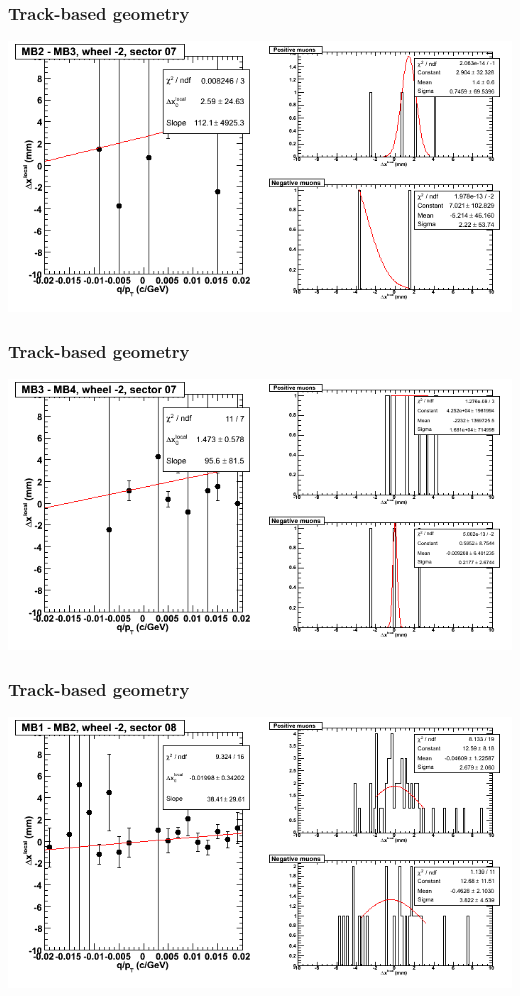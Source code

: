 \documentclass[compress]{beamer}
\begin{document}
\begin{frame}
\frametitle{Track-based geometry}
\includegraphics[width=\linewidth]{NOV4_segdiffs/dt13_resid_A_07_23.png}
\end{frame}

\begin{frame}
\frametitle{Track-based geometry}
\includegraphics[width=\linewidth]{NOV4_segdiffs/dt13_resid_A_07_34.png}
\end{frame}

\begin{frame}
\frametitle{Track-based geometry}
\includegraphics[width=\linewidth]{NOV4_segdiffs/dt13_resid_A_08_12.png}
\end{frame}
\end{document}
